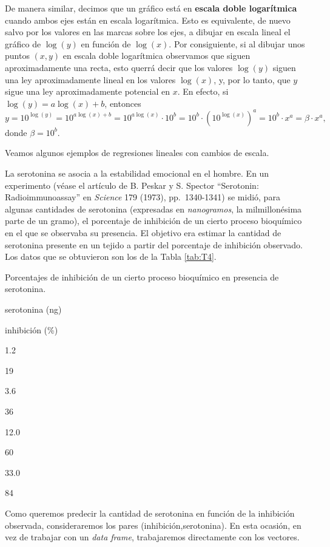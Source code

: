 \documentclass[]{book}
\theoremstyle{definition}
\theoremstyle{definition}
\theoremstyle{definition}
\theoremstyle{remark}
\let\BeginKnitrBlock\begin \let\EndKnitrBlock\end
\begin{document}
De manera similar, decimos que un gráfico está en \textbf{escala doble logarítmica} cuando ambos ejes están en escala logarítmica. Esto es equivalente, de nuevo salvo por los valores en las marcas sobre los ejes, a dibujar en escala lineal el gráfico de \(\log(y)\) en función de \(\log(x)\). Por consiguiente, si al dibujar unos puntos \((x,y)\) en escala doble logarítmica observamos que siguen aproximadamente una recta, esto querrá decir que los valores \(\log(y)\) siguen una ley aproximadamente lineal en los valores \(\log(x)\), y, por lo tanto, que \(y\) sigue una ley aproximadamente potencial en \(x\). En efecto, si \(\log(y)= a\log(x)+b\), entonces
\[
y=10^{\log(y)}= 10^{a\log(x)+b}=10^{a\log(x)}\cdot 10^{b}=10^{b}\cdot (10^{\log(x)})^{a}
=10^{b}\cdot x^{a}=\beta \cdot x^{a},
\]
donde \(\beta=10^b\).

Veamos algunos ejemplos de regresiones lineales con cambios de escala.

\BeginKnitrBlock{example}
\protect\hypertarget{exm:reg3}{}{\label{exm:reg3} }La serotonina se asocia a la estabilidad emocional en el hombre. En un experimento (véase el artículo de B. Peskar y S. Spector ``Serotonin: Radioimmunoassay'' en \emph{Science} 179 (1973), pp.~1340-1341) se midió, para algunas cantidades de serotonina (expresadas en \emph{nanogramos}, la milmillonésima parte de un gramo), el porcentaje de inhibición de un cierto proceso bioquímico en el que se observaba su presencia. El objetivo era estimar la cantidad de serotonina presente en un tejido a partir del porcentaje de inhibición observado. Los datos que se obtuvieron son los de la Tabla \ref{tab:T4}.
\EndKnitrBlock{example}

\label{tab:T4}Porcentajes de inhibición de un cierto proceso bioquímico en presencia de serotonina.

serotonina (ng)

inhibición (\%)

1.2

19

3.6

36

12.0

60

33.0

84

Como queremos predecir la cantidad de serotonina en función de la inhibición observada, consideraremos los pares (inhibición,serotonina). En esta ocasión, en vez de trabajar con un \emph{data frame}, trabajaremos directamente con los vectores.
\end{document}
